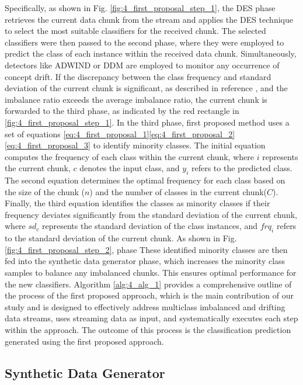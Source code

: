 Specifically, as shown in Fig. \ref{fig:4_first_proposal_step_1}, the DES phase retrieves the current data chunk from the stream and applies the DES technique to select the most suitable classifiers for the received chunk. The selected classifiers were then passed to the second phase, where they were employed to predict the class of each instance within the received data chunk. Simultaneously, detectors like ADWIND or DDM are employed to monitor any occurrence of concept drift. If the discrepancy between the class frequency and standard deviation of the current chunk is significant, as described in reference \cite{gama2004learning}, and the imbalance ratio exceeds the average imbalance ratio, the current chunk is forwarded to the third phase, as indicated by the red rectangle in \ref{fig:4_first_proposal_step_1}. In the third phase, first proposed method uses a set of equations \ref{eq:4_first_proposal_1}\ref{eq:4_first_proposal_2}\ref{eq:4_first_proposal_3}
to identify minority classes. The initial equation computes the frequency of each class within the current chunk, where $i$ represents the current chunk, $c$ denotes the input class, and $y_i$ refers to the predicted class. The second equation determines the optimal frequency for each class based on the size of the chunk ($n$) and the number of classes in the current chunk($C$). Finally, the third equation identifies the classes as minority classes if their frequency deviates significantly from the standard deviation of the current chunk, where $sd_c$ represents the standard deviation of the class instances, and $frq_i$ refers to the standard deviation of the current chunk.
As shown in Fig. \ref{fig:4_first_proposal_step_2}, phase These identified minority classes are then fed into the synthetic data generator phase, which increases the minority class samples to balance any imbalanced chunks. This ensures optimal performance for the new classifiers. Algorithm  \ref{alg:4_alg_1} provides a comprehensive outline of the process of the first proposed approach, which is the main contribution of our study and is designed to effectively address multiclass imbalanced and drifting data streams, uses streaming data as input, and systematically executes each step within the approach. The outcome of this process is the classification prediction generated using the first proposed approach.


\subsection{Synthetic Data Generator}

